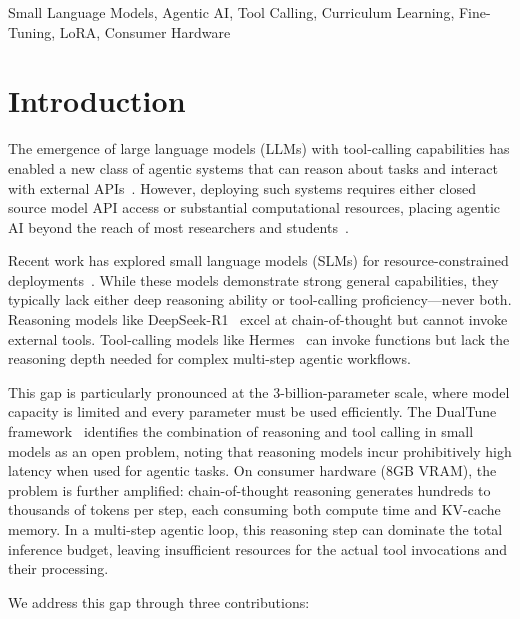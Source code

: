 \documentclass[conference]{IEEEtran}
\begin{document}
\begin{IEEEkeywords}
Small Language Models, Agentic AI, Tool Calling, Curriculum Learning, Fine-Tuning, LoRA, Consumer Hardware
\end{IEEEkeywords}

\section{Introduction}
\label{sec:intro}

The emergence of large language models (LLMs) with tool-calling capabilities has enabled a new class of agentic systems that can reason about tasks and interact with external APIs~\cite{yao2023react, schick2024toolformer}. However, deploying such systems requires either closed source model API access or substantial computational resources, placing agentic AI beyond the reach of most researchers and students~\cite{anthropic2024claude, openai2024gpt4}.

Recent work has explored small language models (SLMs) for resource-constrained deployments~\cite{microsoft2024phi4, meta2024llama32, alibaba2024qwen25}. While these models demonstrate strong general capabilities, they typically lack either deep reasoning ability or tool-calling proficiency---never both. Reasoning models like DeepSeek-R1~\cite{guo2025deepseek} excel at chain-of-thought but cannot invoke external tools. Tool-calling models like Hermes~\cite{nousresearch2024hermes} can invoke functions but lack the reasoning depth needed for complex multi-step agentic workflows.

This gap is particularly pronounced at the 3-billion-parameter scale, where model capacity is limited and every parameter must be used efficiently. The DualTune framework~\cite{kadekodi2025dualtune} identifies the combination of reasoning and tool calling in small models as an open problem, noting that reasoning models incur prohibitively high latency when used for agentic tasks. On consumer hardware (8GB VRAM), the problem is further amplified: chain-of-thought reasoning generates hundreds to thousands of tokens per step, each consuming both compute time and KV-cache memory. In a multi-step agentic loop, this reasoning step can dominate the total inference budget, leaving insufficient resources for the actual tool invocations and their processing.

We address this gap through three contributions:
\end{document}
